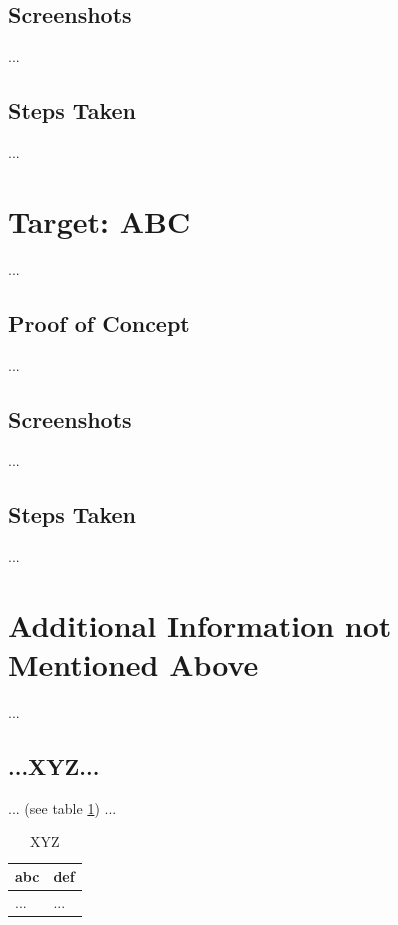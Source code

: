 \subsection{Screenshots}\label{osce-sec:sec4-screens}
%
...
%
%
%
\subsection{Steps Taken}\label{osce-sec:sec4-steps}
%
...
%
%
%
\section{Target: ABC}\label{osce-sec:sec5}
%
...
%
%
%
\subsection{Proof of Concept}\label{osce-sec:sec5-poc}
%
...
%
%
%
\subsection{Screenshots}\label{osce-sec:sec5-screens}
%
...
%
%
%
\subsection{Steps Taken}\label{osce-sec:sec5-steps}
%
...
%
%
%
\section{Additional Information not Mentioned Above}\label{osce-sec:last}
%
...
%
%
%
\subsection{...XYZ...}\label{osce-sec:last-xyz}
%
... (see table \ref{osce-tbl:last-xyz}) ...

\begin{table}[H]
    \begin{tabularx}{\textwidth}{l|l}
        \textbf{abc} & \textbf{def} \\
        \hline
        ... & ...\\
    \end{tabularx}
    \caption{XYZ\label{osce-tbl:last-xyz}}
\end{table}
%
%
%